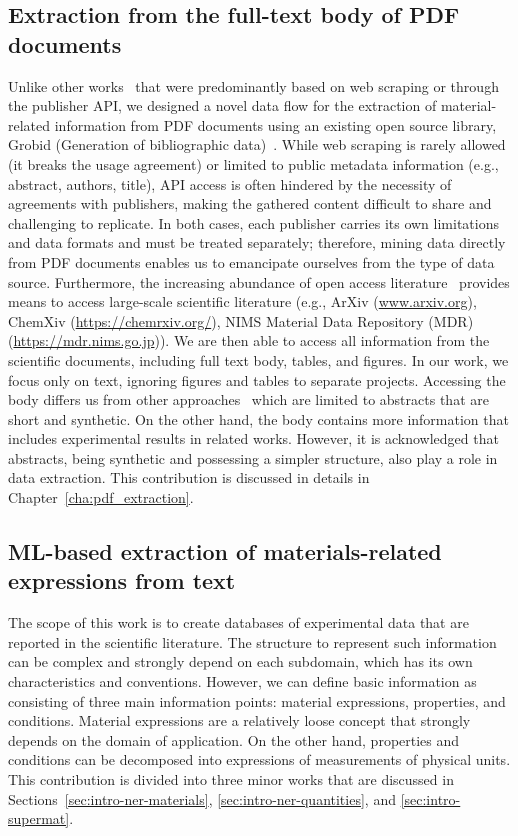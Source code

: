 \subsection{Extraction from the full-text body of PDF documents}
\label{sec:intro-pdf-contribution}

Unlike other works~\cite{court2018auto, court2020magnetic, kononova2019text} that were predominantly based on web scraping or through the publisher API, we designed a novel data flow for the extraction of material-related information from PDF documents using an existing open source library, Grobid (Generation of bibliographic data)~\cite{GROBID}. 
While web scraping is rarely allowed (it breaks the usage agreement) or limited to public metadata information (e.g., abstract, authors, title), API access is often hindered by the necessity of agreements with publishers, making the gathered content difficult to share and challenging to replicate.
In both cases, each publisher carries its own limitations and data formats and must be treated separately; therefore, mining data directly from PDF documents enables us to emancipate ourselves from the type of data source.
Furthermore, the increasing abundance of open access literature~\cite{laakso2011the} provides means to access large-scale scientific literature (e.g., ArXiv (\url{www.arxiv.org}), ChemXiv (\url{https://chemrxiv.org/}), NIMS Material Data Repository (MDR)~\cite{tanifuji2019mdr} (\url{https://mdr.nims.go.jp})). 
We are then able to access all information from the scientific documents, including full text body, tables, and figures. In our work, we focus only on text, ignoring figures and tables to separate projects. 
Accessing the body differs us from other approaches~\cite{yamaguchi-etal-2020-sc} which are limited to abstracts that are short and synthetic. On the other hand, the body contains more information that includes experimental results in related works. 
However, it is acknowledged that abstracts, being synthetic and possessing a simpler structure, also play a role in data extraction.
This contribution is discussed in details in Chapter~\ref{cha:pdf_extraction}.

\subsection{ML-based extraction of materials-related expressions from text}
\label{sec:intro-material-related-extraction}

The scope of this work is to create databases of experimental data that are reported in the scientific literature. 
The structure to represent such information can be complex and strongly depend on each subdomain, which has its own characteristics and conventions. 
However, we can define basic information as consisting of three main information points: material expressions, properties, and conditions. 
Material expressions are a relatively loose concept that strongly depends on the domain of application. On the other hand, properties and conditions can be decomposed into expressions of measurements of physical units. 
This contribution is divided into three minor works that are discussed in Sections~\ref{sec:intro-ner-materials}, \ref{sec:intro-ner-quantities}, and \ref{sec:intro-supermat}.


